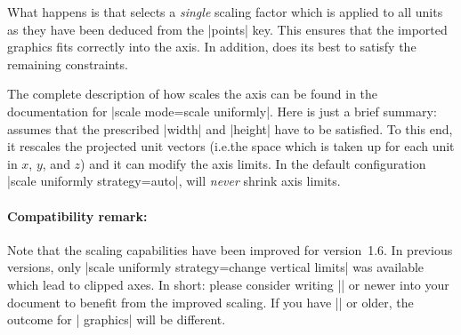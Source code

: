 {{\begin{codeexample}[]
\end{codeexample}
%
\noindent What happens is that \PGFPlots{} selects a \emph{single} scaling
factor which is applied to all units as they have been deduced from the
|points| key. This ensures that the imported graphics fits correctly into the
axis. In addition, \PGFPlots{} does its best to satisfy the remaining
constraints.

The complete description of how \PGFPlots{} scales the axis can be found in the
documentation for |scale mode=scale uniformly|. Here is just a brief summary:
\PGFPlots{} assumes that the prescribed |width| and |height| have to be
satisfied. To this end, it rescales the projected unit vectors (i.e.\@ the
space which is taken up for each unit in $x$, $y$, and $z$) and it can modify
the axis limits. In the default configuration |scale uniformly strategy=auto|,
\PGFPlots{} will \emph{never} shrink axis limits.


\paragraph{Compatibility remark:}

Note that the scaling capabilities have been improved for \PGFPlots{}
version~1.6. In previous versions, only
|scale uniformly strategy=change vertical limits| was available which lead to
clipped axes. In short: please consider writing |\pgfplotsset{compat=1.6}| or
newer into your document to benefit from the improved scaling. If you have
|\pgfplotsset{compat=1.5}| or older, the outcome for | graphics| will
be different.

}}
